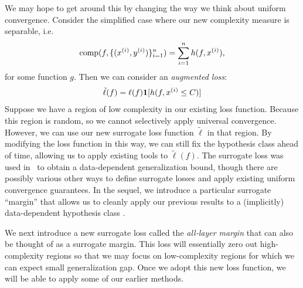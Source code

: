 We may hope to get around this by changing the way we think about uniform convergence. Consider the simplified case where our new complexity measure is separable, i.e.
\begin{align}
    \text{comp}(f, \{(x\sp{i}, y\sp{i})\}_{i=1}^n) = \sum_{i=1}^n h(f, x\sp{i}),
\end{align}
for some function $g$. Then we can consider an \textit{augmented loss}:
\begin{align}
    \tilde{\ell}(f) = \ell(f) \ind{h(f, x\sp{i} \leq C)} \label{eqn:5}
\end{align}
Suppose we have a region of low complexity in our existing loss function. Because this region is random, so we cannot selectively apply universal convergence. However, we can use our new surrogate loss function $\tilde{\ell}$ in that region. By modifying the loss function in this way, we can still fix the hypothesis class ahead of time, allowing us to apply existing tools to $\tilde{\ell}(f)$. The surrogate loss was used in~\cite{wei2019data} to obtain a data-dependent generalization bound, though there are possibly various other ways to define surrogate losses and apply existing uniform convergence guarantees. In the sequel, we introduce a particular surrogate ``margin'' that allows us to cleanly apply our previous results to a (implicitly) data-dependent hypothesis class \cite{wei2019data}.


We next introduce a new surrogate loss called the \textit{all-layer margin} that can also be thought of as a surrogate margin. This loss will essentially zero out high-complexity regions so that we may focus on low-complexity regions for which we can expect small generalization gap. Once we adopt this new loss function, we will be able to apply some of our earlier methods.

